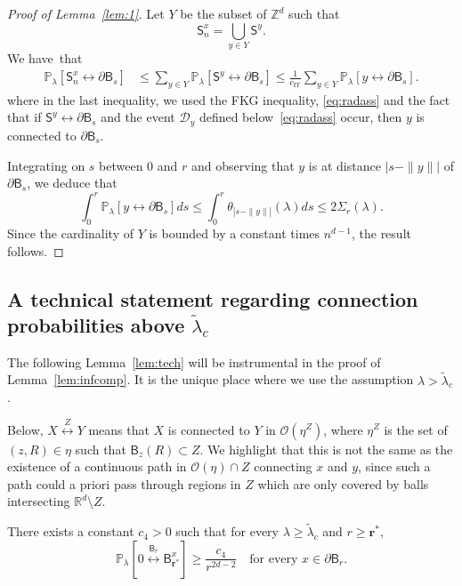 \documentclass[AHL,Unicode,longabstracts]{cedram}
\newcommand{\rbf}{\mathbf{r}}
\DeclareMathOperator{\IT}{IT}
\begin{document}
\begin{proof}[Proof of Lemma~\ref{lem:1}]
Let $Y$ be the subset of ${\mathbb Z}^d$ such that
\[
\mathsf S^x_n=\bigcup_{y\in Y}\mathsf S^y.
\]
We have~that
\begin{align*}
{\mathbb P}_\lambda[\mathsf S^x_n\stackrel{}{\longleftrightarrow}\partial\mathsf B_s]&\le \sum_{y\in Y}{\mathbb P}_\lambda[\mathsf S^y\stackrel{}{\longleftrightarrow}\partial\mathsf B_s]\le \frac1{c_{\IT}}\sum_{y\in Y}{\mathbb P}_\lambda[y\stackrel{}{\longleftrightarrow}\partial\mathsf B_s].
\end{align*}
where in the last inequality, we used the FKG inequality, \eqref{eq:radass} and the fact that if $\mathsf S^y\stackrel{}{\longleftrightarrow}\partial\mathsf B_s$ and the event $\mathcal D_y$ defined below~\eqref{eq:radass} occur, then $y$ is connected to $\partial\mathsf B_s$.

Integrating on $s$ between $0$ and $r$ and observing that $y$ is at distance $|s-\|y\||$ of $\partial\mathsf B_s$, we deduce that
\[
\int_0^r{\mathbb P}_\lambda[y\stackrel{}{\longleftrightarrow}\partial\mathsf B_s]ds\le\int_0^r\theta_{|s-\|y\||}(\lambda)ds\le 2\Sigma_r(\lambda).
\]
Since the cardinality of $Y$ is bounded by a constant times $n^{d-1}$, the result follows.
\end{proof}


\subsection{A technical statement regarding connection probabilities above \texorpdfstring{$\widetilde\lambda_c$}{lambdac}}\label{subsec3.2}

The following Lemma~\ref{lem:tech} will be instrumental in the proof of Lemma~\ref{lem:infcomp}. It is the unique place where we use the assumption $\lambda>\widetilde\lambda_c$.

Below, $X\stackrel{Z}{\longleftrightarrow}Y$ means that $X$ is connected to $Y$ in ${\mathcal O}(\eta^Z)$, where $\eta^Z$ is the set of $(z,R)\in \eta$ such that $\mathsf B_z(R)\subset Z$. We highlight that this is not the same as the existence of a continuous path in ${\mathcal O}(\eta)\cap Z$ connecting $x$ and $y$, since such a path could a priori pass through regions in $Z$ which are only covered by balls intersecting ${\mathbb R}^d\setminus Z$.

\begin{lemm}\label{lem:tech}
There exists a constant $c_4>0$ such that for every $\lambda\ge \widetilde\lambda_c$ and $r\ge {\rbf^*}$,
\begin{equation}\label{eq:connect}
{\mathbb P}_\lambda \left[0 \stackrel{\mathsf B_r}{\longleftrightarrow} \mathsf B_{\rbf^*}^x \right] \geq \frac{c_4}{r^{2d - 2 }}\quad\text{for every } x\in\partial\mathsf B_r.
\end{equation}
\end{lemm}
\end{document}
